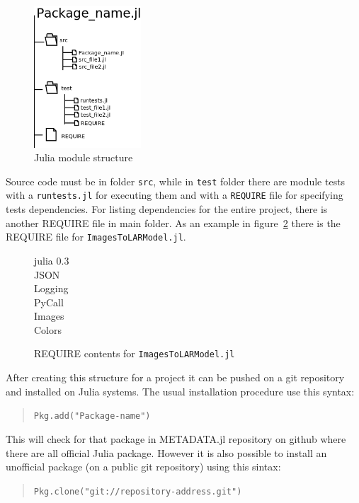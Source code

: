 \documentclass[11pt,oneside]{article}	%
\begin{document}
\begin{figure}[htb]
  \begin{center}
    \includegraphics[width=4cm]{images/module-files.png}
  \end{center}
  \caption{Julia module structure}
  \label{fig:julia-module}
\end{figure}

Source code must be in folder \texttt{src}, while in \texttt{test} folder there are module tests with a \texttt{runtests.jl} for executing them and with a \texttt{REQUIRE} file for specifying tests dependencies. For listing dependencies for the entire project, there is another REQUIRE file in main folder. As an example in figure~\ref{fig:require-example} there is the REQUIRE file for \texttt{ImagesToLARModel.jl}.

\begin{figure}[htb]
  \begin{center}
    julia 0.3\\
    JSON\\
    Logging\\
    PyCall\\
    Images\\
    Colors
  \end{center}
  \caption{REQUIRE contents for \texttt{ImagesToLARModel.jl}}
  \label{fig:require-example}
\end{figure}

After creating this structure for a project it can be pushed on a git repository and installed on Julia systems. The usual installation procedure use this syntax:
\begin{quote}
 \texttt{Pkg.add("Package-name")}
\end{quote}

This will check for that package in METADATA.jl repository on github where there are all official Julia package. However it is also possible to install an unofficial package (on a public git repository) using this sintax:
\begin{quote}
 \texttt{Pkg.clone("git://repository-address.git")}
\end{quote}
\end{document}
